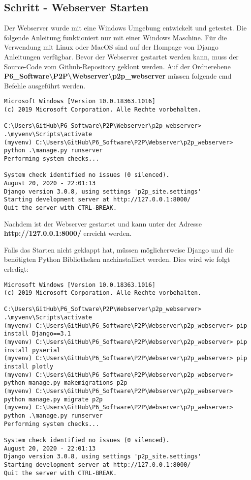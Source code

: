 \subsection{Schritt - Webserver Starten}\label{sec:SchrittWebserverStarten}
Der Webserver wurde mit eine Windows Umgebung entwickelt und getestet. Die folgende Anleitung funktioniert nur mit einer Windows Maschine. Für die Verwendung mit Linux oder MacOS sind auf der Hompage von Django Anleitungen verfügbar.
Bevor der Webserver gestartet werden kann, muss der Source-Code vom \href{https://github.com/Rouben94/P6_Software}{Github-Repository\footnotemark[\value{footnote}]} geklont werden. Auf der Ordnerebene \textbf{P6\_Software\textbackslash P2P\textbackslash Webserver\textbackslash p2p\_webserver} müssen folgende cmd Befehle ausgeführt werden.

\begin{lstlisting}[style=DOS]
Microsoft Windows [Version 10.0.18363.1016]
(c) 2019 Microsoft Corporation. Alle Rechte vorbehalten.

C:\Users\GitHub\P6_Software\P2P\Webserver\p2p_webserver> .\myvenv\Scripts\activate
(myvenv) C:\Users\GitHub\P6_Software\P2P\Webserver\p2p_webserver> python .\manage.py runserver
Performing system checks...
	
System check identified no issues (0 silenced).
August 20, 2020 - 22:01:13
Django version 3.0.8, using settings 'p2p_site.settings'
Starting development server at http://127.0.0.1:8000/   
Quit the server with CTRL-BREAK.
\end{lstlisting}

Nachdem ist der Webserver gestartet und kann unter der Adresse \textbf{http://127.0.0.1:8000/} erreicht werden.

Falls das Starten nicht geklappt hat, müssen möglicherweise Django und die benötigten Python Bibliotheken nachinstalliert werden. Dies wird wie folgt erledigt:

\begin{lstlisting}[style=DOS]
Microsoft Windows [Version 10.0.18363.1016]
(c) 2019 Microsoft Corporation. Alle Rechte vorbehalten.

C:\Users\GitHub\P6_Software\P2P\Webserver\p2p_webserver> .\myvenv\Scripts\activate
(myvenv) C:\Users\GitHub\P6_Software\P2P\Webserver\p2p_webserver> pip install Django==3.1
(myvenv) C:\Users\GitHub\P6_Software\P2P\Webserver\p2p_webserver> pip install pyserial
(myvenv) C:\Users\GitHub\P6_Software\P2P\Webserver\p2p_webserver> pip install plotly
(myvenv) C:\Users\GitHub\P6_Software\P2P\Webserver\p2p_webserver> python manage.py makemigrations p2p
(myvenv) C:\Users\GitHub\P6_Software\P2P\Webserver\p2p_webserver> python manage.py migrate p2p
(myvenv) C:\Users\GitHub\P6_Software\P2P\Webserver\p2p_webserver> python .\manage.py runserver
Performing system checks...

System check identified no issues (0 silenced).
August 20, 2020 - 22:01:13
Django version 3.0.8, using settings 'p2p_site.settings'
Starting development server at http://127.0.0.1:8000/   
Quit the server with CTRL-BREAK.
\end{lstlisting}

